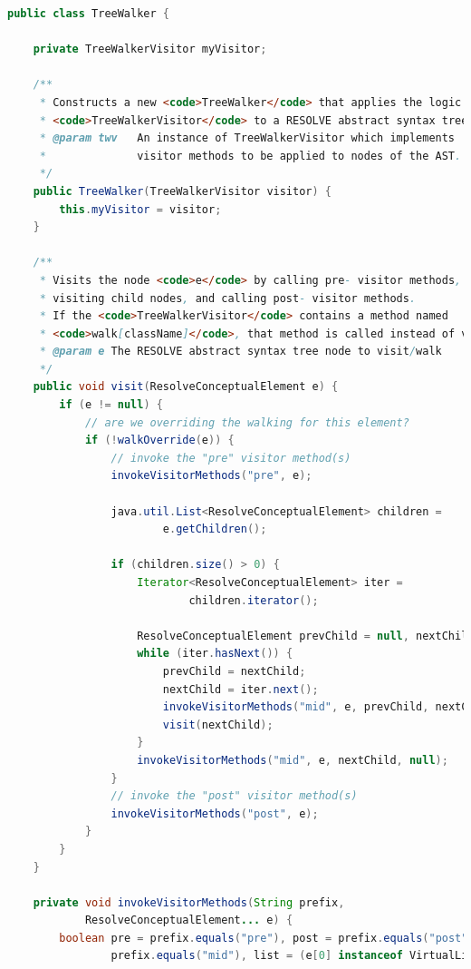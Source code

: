 \documentclass[times]{speauth}
\begin{document}
\begin{lstlisting}[language=java,caption={TreeWalker.java}]
public class TreeWalker {

    private TreeWalkerVisitor myVisitor;

    /**
     * Constructs a new <code>TreeWalker</code> that applies the logic of
     * <code>TreeWalkerVisitor</code> to a RESOLVE abstract syntax tree.
     * @param twv	An instance of TreeWalkerVisitor which implements
     * 				visitor methods to be applied to nodes of the AST.
     */
    public TreeWalker(TreeWalkerVisitor visitor) {
        this.myVisitor = visitor;
    }

    /**
     * Visits the node <code>e</code> by calling pre- visitor methods, recursively
     * visiting child nodes, and calling post- visitor methods.
     * If the <code>TreeWalkerVisitor</code> contains a method named
     * <code>walk[className]</code>, that method is called instead of visiting the children.
     * @param e	The RESOLVE abstract syntax tree node to visit/walk
     */
    public void visit(ResolveConceptualElement e) {
        if (e != null) {
            // are we overriding the walking for this element?
            if (!walkOverride(e)) {
                // invoke the "pre" visitor method(s)
                invokeVisitorMethods("pre", e);

                java.util.List<ResolveConceptualElement> children =
                        e.getChildren();

                if (children.size() > 0) {
                    Iterator<ResolveConceptualElement> iter =
                            children.iterator();

                    ResolveConceptualElement prevChild = null, nextChild = null;
                    while (iter.hasNext()) {
                        prevChild = nextChild;
                        nextChild = iter.next();
                        invokeVisitorMethods("mid", e, prevChild, nextChild);
                        visit(nextChild);
                    }
                    invokeVisitorMethods("mid", e, nextChild, null);
                }
                // invoke the "post" visitor method(s)
                invokeVisitorMethods("post", e);
            }
        }
    }

    private void invokeVisitorMethods(String prefix,
            ResolveConceptualElement... e) {
        boolean pre = prefix.equals("pre"), post = prefix.equals("post"), mid =
                prefix.equals("mid"), list = (e[0] instanceof VirtualListNode);


\end{lstlisting}
\end{document}
